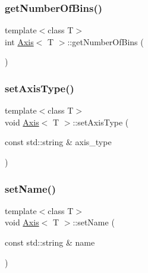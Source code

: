 \mbox{\label{class_axis_a0e7c39c0886672e26fc8f374b2062790}} 
\subsubsection{\texorpdfstring{get\+Number\+Of\+Bins()}{getNumberOfBins()}}
{\footnotesize\ttfamily template$<$class T$>$ \\
int \hyperlink{class_axis}{Axis}$<$ T $>$\+::get\+Number\+Of\+Bins (\begin{DoxyParamCaption}{ }\end{DoxyParamCaption})\hspace{0.3cm}{\ttfamily [inline]}}

\mbox{\label{class_axis_ab770c647c999bc91ec01fd810ba4f17a}} 
\subsubsection{\texorpdfstring{set\+Axis\+Type()}{setAxisType()}}
{\footnotesize\ttfamily template$<$class T$>$ \\
void \hyperlink{class_axis}{Axis}$<$ T $>$\+::set\+Axis\+Type (\begin{DoxyParamCaption}\item[{const std\+::string \&}]{axis\+\_\+type }\end{DoxyParamCaption})\hspace{0.3cm}{\ttfamily [inline]}}

\mbox{\label{class_axis_acbe541be65dfbd06454a819782330942}} 
\subsubsection{\texorpdfstring{set\+Name()}{setName()}}
{\footnotesize\ttfamily template$<$class T$>$ \\
void \hyperlink{class_axis}{Axis}$<$ T $>$\+::set\+Name (\begin{DoxyParamCaption}\item[{const std\+::string \&}]{name }\end{DoxyParamCaption})\hspace{0.3cm}{\ttfamily [inline]}}

